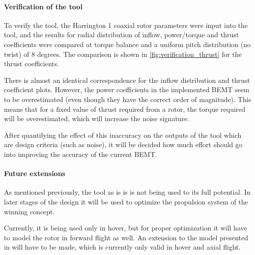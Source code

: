 \paragraph{Verification of the tool}


To verify the tool, the Harrington 1 coaxial rotor parameters were input into the tool, and the results for radial distribution of inflow, power/torque and thrust coefficients were compared at torque balance and a uniform pitch distribution (no twist) of 8 degrees. The comparison is shown in  \autoref{fig:verification_thrust} for the thrust coefficients. 

There is almost an identical correspondence for the inflow distribution and thrust coefficient plots. However, the power coefficients in the implemented BEMT seem to be overestimated (even though they have the correct order of magnitude). This means that for a fixed value of thrust required from a rotor, the torque required will be overestimated, which will increase the noise signature.

After quantifying the effect of this inaccuracy on the outputs of the tool which are design criteria (such as noise), it will be decided how much effort should go into improving the accuracy of the current BEMT.






\paragraph{Future extensions}

As mentioned previously, the tool as is is is not being used to its full potential. In later stages of the design it will be used to optimize the propulsion system of the winning concept.

Currently, it is being used only in hover, but for proper optimization it will have to model the rotor in forward flight as well. An extension to the model presented in \cite{BEMT} will have to be made, which is currently only valid in hover and axial flight.

 
